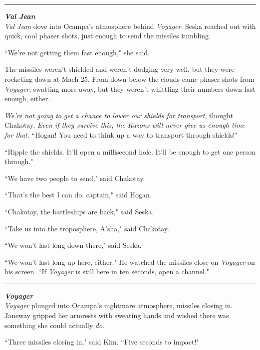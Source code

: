 \documentclass[twoside,letterpaper,12pt]{memoir}
\begin{document}
\begin{center}\rule{3cm}{0.4 pt}\end{center}

\noindent\textit{\textbf{Val Jean}}\\

\textit{Val Jean} dove into Ocampa's atmosphere behind \textit{Voyager}. Seska reached out with quick, cool phaser shots, just enough to send the missiles tumbling.

``We're not getting them fast enough," she said.

The missiles weren't shielded and weren't dodging very well, but they were rocketing down at Mach 25. From down below the clouds came phaser shots from \textit{Voyager}, swatting more away, but they weren't whittling their numbers down fast enough, either.

\textit{We're not going to get a chance to lower our shields for transport}, thought Chakotay. \textit{Even if they survive this, the Kazons will never give us enough time for that}. ``Hogan! You need to think up a way to transport through shields!"

``Ripple the shields. It'll open a millisecond hole. It'll be enough to get one person through."

``We have two people to send," said Chakotay.

``That's the best I can do, captain," said Hogan.

``Chakotay, the battleships are back," said Seska.

``Take us into the troposphere, A'sha," said Chakotay.

``We won't last long down there," said Seska.

``We won't last long up here, either." He watched the missiles close on \textit{Voyager} on his screen. ``If \textit{Voyager} is still here in ten seconds, open a channel."

\begin{center}\rule{3cm}{0.4 pt}\end{center}

\noindent\textit{\textbf{Voyager}}\\

\textit{Voyager} plunged into Ocampa's nightmare atmosphere, missiles closing in. Janeway gripped her armrests with sweating hands and wished there was something she could actually \textit{do}.

``Three missiles closing in," said Kim. ``Five seconds to impact!"
\end{document}
